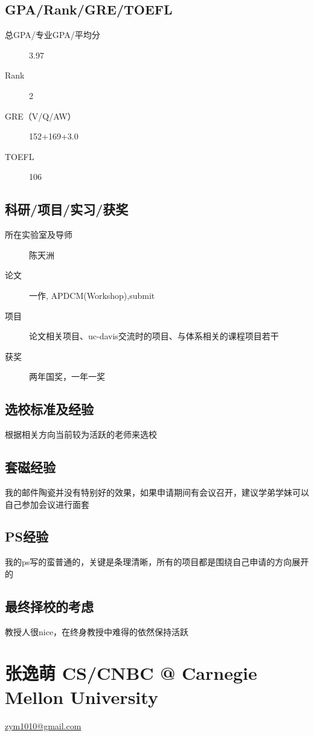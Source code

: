 \documentclass[11pt,fleqn,openany]{book} %
\begin{document}
\subsection*{GPA/Rank/GRE/TOEFL}
\begin{description}
\item[总GPA/专业GPA/平均分] 3.97
\item[Rank] 2
\item[GRE（V/Q/AW）] 152+169+3.0
\item[TOEFL] 106
\end{description}

\subsection*{科研/项目/实习/获奖}
\begin{description}
\item[所在实验室及导师] 陈天洲
\item[论文] 一作, APDCM(Workshop),submit
\item[项目] 论文相关项目、uc-davis交流时的项目、与体系相关的课程项目若干
\item[获奖] 两年国奖，一年一奖
\end{description}
\subsection*{选校标准及经验}
根据相关方向当前较为活跃的老师来选校
\subsection*{套磁经验}
我的邮件陶瓷并没有特别好的效果，如果申请期间有会议召开，建议学弟学妹可以自己参加会议进行面套
\subsection*{PS经验}
我的ps写的蛮普通的，关键是条理清晰，所有的项目都是围绕自己申请的方向展开的
\subsection*{最终择校的考虑}
教授人很nice，在终身教授中难得的依然保持活跃
\clearpage
\section{张逸萌 CS/CNBC @ Carnegie Mellon University}
\hfill \href{mailto:zym1010@gmail.com}{zym1010@gmail.com}
\end{document}
